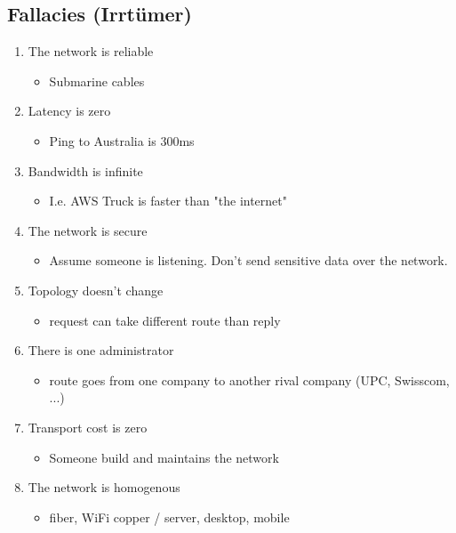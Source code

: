 \subsection{Fallacies (Irrtümer)}
\begin{enumerate}
    \item The network is reliable
    \begin{itemize}
        \item Submarine cables
    \end{itemize}
    \item Latency is zero
    \begin{itemize}
        \item Ping to Australia is 300ms 
    \end{itemize}
    \item Bandwidth is infinite
    \begin{itemize}
        \item I.e. AWS Truck is faster than "the internet"
    \end{itemize}
    \item The network is secure
    \begin{itemize}
        \item Assume someone is listening. Don’t send sensitive data over the network.
    \end{itemize}
    \item Topology doesn’t change
    \begin{itemize}
        \item request can take different route than reply
    \end{itemize}
    \item There is one administrator
    \begin{itemize}
        \item route goes from one company to another rival company (UPC, Swisscom, ...)
    \end{itemize}
    \item Transport cost is zero
    \begin{itemize}
        \item Someone build and maintains the network
    \end{itemize}
    \item The network is homogenous
    \begin{itemize}
        \item fiber, WiFi copper / server, desktop, mobile
    \end{itemize}
\end{enumerate}

\vfill
$ $
\columnbreak

